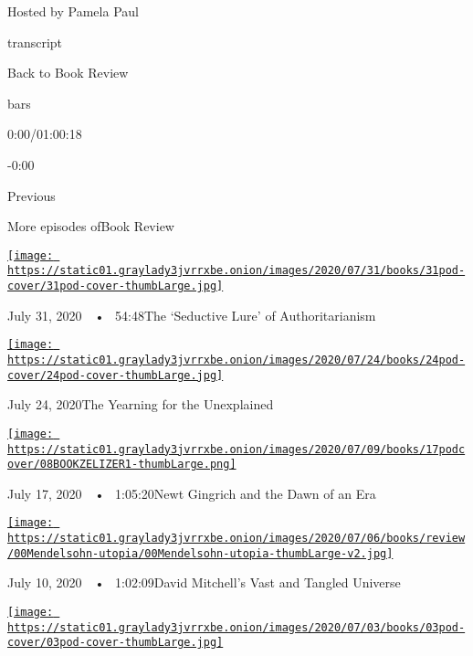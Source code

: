 Hosted by Pamela Paul

transcript

Back to Book Review

bars

0:00/01:00:18

-0:00

Previous

More episodes ofBook Review

\href{https://www.nytimes3xbfgragh.onion/2020/07/31/books/review/podcast-twilight-democracy-anne-applebaum-eat-buddha-barbara-demick.html?action=click\&module=audio-series-bar\&region=header\&pgtype=Article}{\texttt{[image: https://static01.graylady3jvrrxbe.onion/images/2020/07/31/books/31pod-cover/31pod-cover-thumbLarge.jpg]}}

July 31, 2020~~•~ 54:48The `Seductive Lure' of Authoritarianism

\href{https://www.nytimes3xbfgragh.onion/2020/07/24/books/review/podcast-colin-dickey-unexplained-miles-harvey-king-of-confidence.html?action=click\&module=audio-series-bar\&region=header\&pgtype=Article}{\texttt{[image: https://static01.graylady3jvrrxbe.onion/images/2020/07/24/books/24pod-cover/24pod-cover-thumbLarge.jpg]}}

July 24, 2020The Yearning for the Unexplained

\href{https://www.nytimes3xbfgragh.onion/2020/07/17/books/review/podcast-julian-zelizer-burning-down-house-newt-gingrich-notes-silencing-lacy-crawford.html?action=click\&module=audio-series-bar\&region=header\&pgtype=Article}{\texttt{[image: https://static01.graylady3jvrrxbe.onion/images/2020/07/09/books/17podcover/08BOOKZELIZER1-thumbLarge.png]}}

July 17, 2020~~•~ 1:05:20Newt Gingrich and the Dawn of an Era

\href{https://www.nytimes3xbfgragh.onion/2020/07/10/books/review/david-mitchell-utopia-avenue-daniel-mendelsohn-biggest-bluff-poker-maria-konnikova.html?action=click\&module=audio-series-bar\&region=header\&pgtype=Article}{\texttt{[image: https://static01.graylady3jvrrxbe.onion/images/2020/07/06/books/review/00Mendelsohn-utopia/00Mendelsohn-utopia-thumbLarge-v2.jpg]}}

July 10, 2020~~•~ 1:02:09David Mitchell's Vast and Tangled Universe

\href{https://www.nytimes3xbfgragh.onion/2020/07/03/books/review/podcast-jules-feiffer-smart-george-steve-inskeep-imperfect-union.html?action=click\&module=audio-series-bar\&region=header\&pgtype=Article}{\texttt{[image: https://static01.graylady3jvrrxbe.onion/images/2020/07/03/books/03pod-cover/03pod-cover-thumbLarge.jpg]}}

